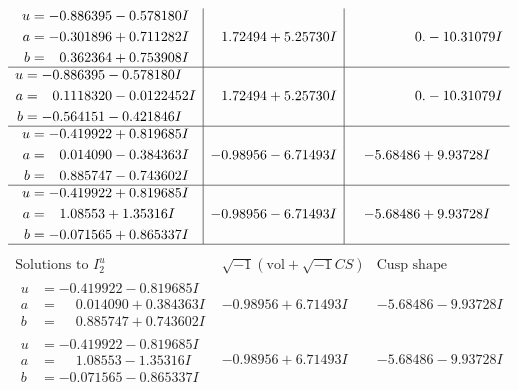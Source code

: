 \documentclass[1p]{elsarticle_modified}
\theoremstyle{definition}
\newcommand{\I}{\sqrt{-1}}
\begin{document}
$$\begin{array}{c|c|c}
\begin{aligned}
u &= -0.886395 - 0.578180 I \\
a &= -0.301896 + 0.711282 I \\
b &= \phantom{-}0.362364 + 0.753908 I\end{aligned}
 & \phantom{-}1.72494 + 5.25730 I & \phantom{-0.000000 } 0. - 10.31079 I \\ \hline\begin{aligned}
u &= -0.886395 - 0.578180 I \\
a &= \phantom{-}0.1118320 - 0.0122452 I \\
b &= -0.564151 - 0.421846 I\end{aligned}
 & \phantom{-}1.72494 + 5.25730 I & \phantom{-0.000000 } 0. - 10.31079 I \\ \hline\begin{aligned}
u &= -0.419922 + 0.819685 I \\
a &= \phantom{-}0.014090 - 0.384363 I \\
b &= \phantom{-}0.885747 - 0.743602 I\end{aligned}
 & -0.98956 - 6.71493 I & -5.68486 + 9.93728 I \\ \hline\begin{aligned}
u &= -0.419922 + 0.819685 I \\
a &= \phantom{-}1.08553 + 1.35316 I \\
b &= -0.071565 + 0.865337 I\end{aligned}
 & -0.98956 - 6.71493 I & -5.68486 + 9.93728 I\\
 \hline 
 \end{array}$$\newpage$$\begin{array}{c|c|c}  
\text{Solutions to }I^u_{2}& \I (\text{vol} + \sqrt{-1}CS) & \text{Cusp shape}\\
 \hline 
\begin{aligned}
u &= -0.419922 - 0.819685 I \\
a &= \phantom{-}0.014090 + 0.384363 I \\
b &= \phantom{-}0.885747 + 0.743602 I\end{aligned}
 & -0.98956 + 6.71493 I & -5.68486 - 9.93728 I \\ \hline\begin{aligned}
u &= -0.419922 - 0.819685 I \\
a &= \phantom{-}1.08553 - 1.35316 I \\
b &= -0.071565 - 0.865337 I\end{aligned}
 & -0.98956 + 6.71493 I & -5.68486 - 9.93728 I \\ \hline\begin{aligned}

\end{aligned}
\end{array}$$
\end{document}
